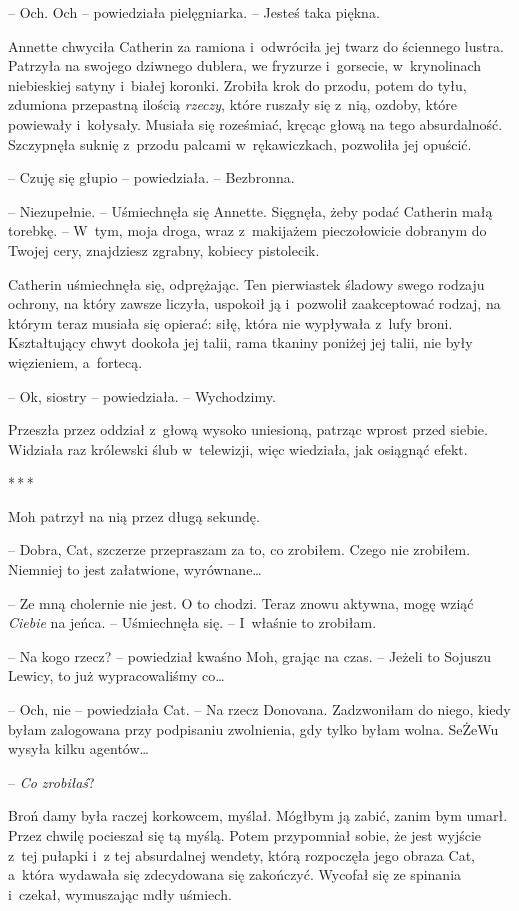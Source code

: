 \documentclass[oneside,polish,11pt,sfheadings]{mwbk}
\newcommand{\threeast}{\bigskip\par\centerline{*\,*\,*}\medskip\par}%
\begin{document}
-- Och. Och -- powiedziała pielęgniarka. -- Jesteś taka piękna.

Annette chwyciła Catherin za ramiona i~odwróciła jej twarz do ściennego
lustra. Patrzyła na swojego dziwnego dublera, we fryzurze i~gorsecie, w~krynolinach niebieskiej satyny i~białej koronki. Zrobiła krok do przodu,
potem do tyłu, zdumiona przepastną ilością \emph{rzeczy}, które ruszały
się z~nią, ozdoby, które powiewały i~kołysały. Musiała się roześmiać,
kręcąc głową na tego absurdalność. Szczypnęła suknię z~przodu palcami w~rękawiczkach, pozwoliła jej opuścić.

-- Czuję się głupio -- powiedziała. -- Bezbronna.

-- Niezupełnie. -- Uśmiechnęła się Annette. Sięgnęła, żeby podać Catherin
małą torebkę. -- W~tym, moja droga, wraz z~makijażem pieczołowicie
dobranym do Twojej cery, znajdziesz zgrabny, kobiecy pistolecik.

Catherin uśmiechnęła się, odprężając. Ten pierwiastek śladowy swego
rodzaju ochrony, na który zawsze liczyła, uspokoił ją i~pozwolił
zaakceptować rodzaj, na którym teraz musiała się opierać: siłę, która
nie wypływała z~lufy broni. Kształtujący chwyt dookoła jej talii, rama
tkaniny poniżej jej talii, nie były więzieniem, a~fortecą.

-- Ok, siostry -- powiedziała. -- Wychodzimy.

Przeszła przez oddział z~głową wysoko uniesioną, patrząc wprost przed
siebie. Widziała raz królewski ślub w~telewizji, więc wiedziała, jak
osiągnąć efekt.
  \threeast 

Moh patrzył na nią przez długą sekundę.

-- Dobra, Cat, szczerze przepraszam za to, co zrobiłem. Czego nie
zrobiłem. Niemniej to jest załatwione, wyrównane\ldots

-- Ze mną cholernie nie jest. O to chodzi. Teraz znowu aktywna, mogę
wziąć \emph{Ciebie} na jeńca. -- Uśmiechnęła się. -- I~właśnie to
zrobiłam.

-- Na kogo rzecz? -- powiedział kwaśno Moh, grając na czas. -- Jeżeli to
Sojuszu Lewicy, to już wypracowaliśmy co\ldots

-- Och, nie -- powiedziała Cat. -- Na rzecz Donovana. Zadzwoniłam do niego,
kiedy byłam zalogowana przy podpisaniu zwolnienia, gdy tylko byłam
wolna. SeŻeWu wysyła kilku agentów\ldots

-- \emph{Co zrobiłaś}?

Broń damy była raczej korkowcem, myślał. Mógłbym ją zabić, zanim bym
umarł. Przez chwilę pocieszał się tą myślą. Potem przypomniał sobie, że
jest wyjście z~tej pułapki i~z tej absurdalnej wendety, którą rozpoczęła
jego obraza Cat, a~która wydawała się zdecydowana się zakończyć. Wycofał
się ze spinania i~czekał, wymuszając mdły uśmiech.
\end{document}
